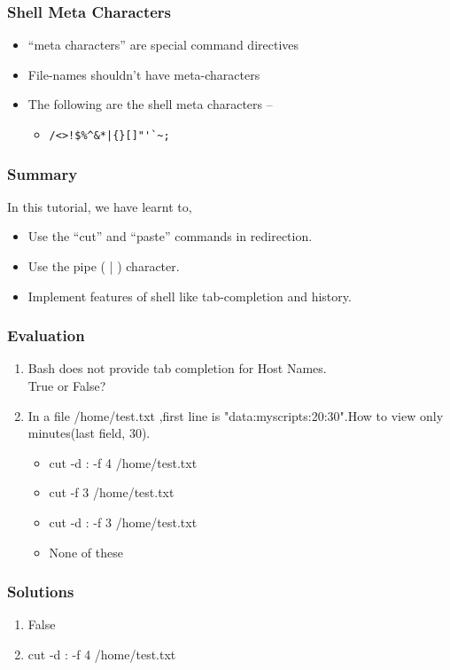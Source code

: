\documentclass[12pt,compress]{beamer}
\begin{document}
\begin{frame}[fragile]
  \frametitle{Shell Meta Characters}
  \begin{itemize}
  \item ``meta characters''  are special command directives
  \item File-names shouldn't have meta-characters
  \item The following are the shell meta characters --
  \begin{itemize}
  \item   \verb+/<>!$%^&*|{}[]"'`~;+
  \end{itemize}
  \end{itemize}
\end{frame}

\begin{frame}
\frametitle{Summary}
\label{sec-8}

  In this tutorial, we have learnt to,


\begin{itemize}
\item Use the ``cut'' and ``paste'' commands in redirection.
\item Use the pipe ( | ) character. 
\item Implement features of shell like tab-completion and history. 
\end{itemize}
\end{frame}
\begin{frame}[fragile]
\frametitle{Evaluation}
\label{sec-9}


\begin{enumerate}
\item Bash does not provide tab completion for Host Names. \\
      True or False? 
\vspace{12pt}
\item In a file /home/test.txt ,first line is "data:myscripts:20:30".How to 
      view only minutes(last field, 30). 
\vspace{5pt}
\begin{itemize}
\item cut -d : -f 4 /home/test.txt
\item cut -f 3 /home/test.txt
\item cut -d : -f 3 /home/test.txt
\item None of these
\end{itemize}
\end{enumerate}
\end{frame}
\begin{frame}
\frametitle{Solutions}
\label{sec-10}


\begin{enumerate}
\item False
\vspace{15pt}
\item cut -d : -f 4 /home/test.txt
\end{enumerate}
\end{frame}
\end{document}
